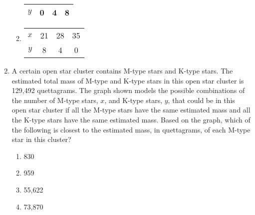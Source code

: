 \documentclass[12pt]{exam}
\begin{document}
\begin{enumerate}
\begin{enumerate}[label=\Alph*)]
\begin{tabular}{|c|c|c|c|}
                $y$ & 0 & 4 & 8 \\
                \hline
            \end{tabular}
        \item 
            \begin{tabular}{|c|c|c|c|}
                \hline
                $x$ & 21 & 28 & 35 \\
                $y$ & 8 & 4 & 0 \\
                \hline
            \end{tabular}
    \end{enumerate}
    \item A certain open star cluster contains M-type stars and K-type stars. The estimated total mass of M-type and K-type stars in this open star cluster is 129{,}492 quettagrams. The graph shown models the possible combinations of the number of M-type stars, $x$, and K-type stars, $y$, that could be in this open star cluster if all the M-type stars have the same estimated mass and all the K-type stars have the same estimated mass. Based on the graph, which of the following is closest to the estimated mass, in quettagrams, of each M-type star in this cluster?

\begin{enumerate}[label=\Alph*)]
    \item 830
    \item 959
    \item 55{,}622
    \item 73{,}870
\end{enumerate}

\begin{center}
\end{center}
\end{enumerate}
\end{document}
